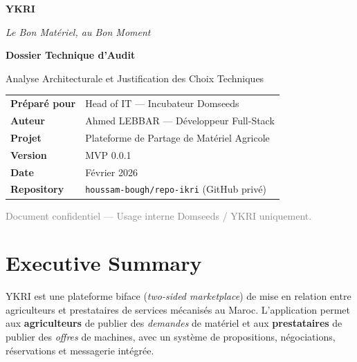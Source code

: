 \documentclass[12pt, a4paper]{article}
\begin{document}
\begin{titlepage}
\centering
\vspace*{2cm}

{\Huge\bfseries\textcolor{ykriGreen}{YKRI}\par}
\vspace{0.3cm}
{\large\textcolor{ykriOrange}{\textit{Le Bon Matériel, au Bon Moment}}\par}

\vspace{2cm}

{\LARGE\bfseries Dossier Technique d'Audit\par}
\vspace{0.4cm}
{\large Analyse Architecturale et Justification des Choix Techniques\par}

\vspace{3cm}

\begin{tabular}{ll}
\textbf{Préparé pour}  & Head of IT — Incubateur Domseeds \\
\textbf{Auteur}        & Ahmed LEBBAR — Développeur Full-Stack \\
\textbf{Projet}        & Plateforme de Partage de Matériel Agricole \\
\textbf{Version}       & MVP 0.0.1 \\
\textbf{Date}          & Février 2026 \\
\textbf{Repository}    & \texttt{houssam-bough/repo-ikri} (GitHub privé) \\
\end{tabular}

\vfill
{\small\textcolor{gray}{Document confidentiel — Usage interne Domseeds / YKRI uniquement.}}
\end{titlepage}

\tableofcontents
\newpage

\section{Executive Summary}

YKRI est une plateforme biface (\textit{two-sided marketplace}) de mise en relation entre agriculteurs et prestataires de services mécanisés au Maroc. L'application permet aux \textbf{agriculteurs} de publier des \textit{demandes} de matériel et aux \textbf{prestataires} de publier des \textit{offres} de machines, avec un système de propositions, négociations, réservations et messagerie intégrée.
\end{document}
